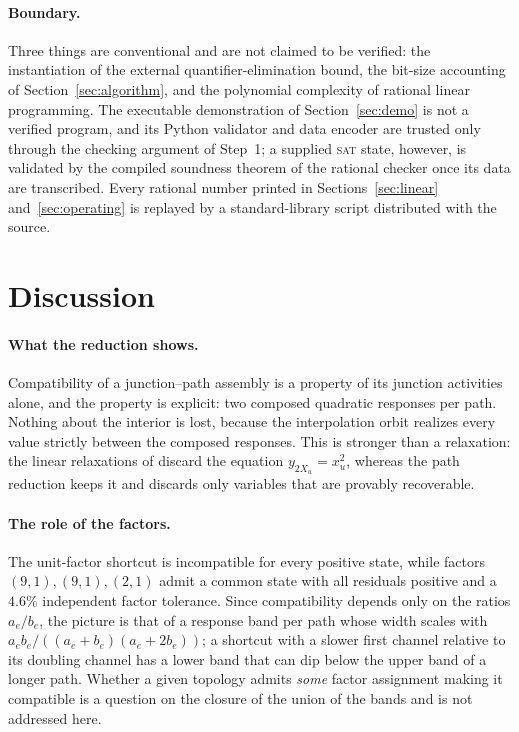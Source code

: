 \documentclass[11pt,a4paper]{article}
\theoremstyle{plain}
\theoremstyle{definition}
\theoremstyle{remark}
\begin{document}
\paragraph{Boundary.} Three things are conventional and are not claimed to be verified: the instantiation of the external quantifier-elimination bound, the bit-size accounting of Section~\ref{sec:algorithm}, and the polynomial complexity of rational linear programming. The executable demonstration of Section~\ref{sec:demo} is not a verified program, and its Python validator and data encoder are trusted only through the checking argument of Step~1; a supplied \textsc{sat} state, however, is validated by the compiled soundness theorem of the rational checker once its data are transcribed. Every rational number printed in Sections~\ref{sec:linear} and~\ref{sec:operating} is replayed by a standard-library script distributed with the source.

\section{Discussion}\label{sec:discussion}

\paragraph{What the reduction shows.} Compatibility of a junction--path assembly is a property of its junction activities alone, and the property is explicit: two composed quadratic responses per path. Nothing about the interior is lost, because the interpolation orbit realizes every value strictly between the composed responses. This is stronger than a relaxation: the linear relaxations of \citep{tcic2026,tcch2026} discard the equation $y_{2X_u}=x_u^2$, whereas the path reduction keeps it and discards only variables that are provably recoverable.

\paragraph{The role of the factors.} The unit-factor shortcut is incompatible for every positive state, while factors $(9,1),(9,1),(2,1)$ admit a common state with all residuals positive and a $4.6\%$ independent factor tolerance. Since compatibility depends only on the ratios $a_e/b_e$, the picture is that of a response band per path whose width scales with $a_e b_e/((a_e+b_e)(a_e+2b_e))$; a shortcut with a slower first channel relative to its doubling channel has a lower band that can dip below the upper band of a longer path. Whether a given topology admits \emph{some} factor assignment making it compatible is a question on the closure of the union of the bands and is not addressed here.
\end{document}
